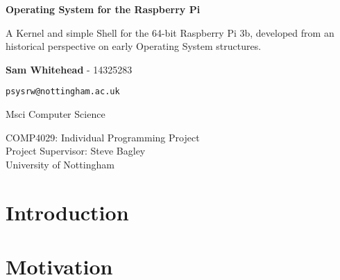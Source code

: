 \documentclass{article}
\begin{document}
\begin{titlepage}
    \begin{center}
        \null\mbox{}\vfill

        \vspace*{1cm}

        \huge
        \textbf{Operating System for the Raspberry Pi}

        \vspace{0.5cm}
        \Large
        A Kernel and simple Shell for the 64-bit Raspberry Pi 3b, developed
        from an historical perspective on early Operating System structures.

        \Large

        \vspace{2.5cm}

        \textbf{Sam Whitehead} - 14325283

        \texttt{psysrw@nottingham.ac.uk}

        Msci Computer Science

        \vfill

        COMP4029: Individual Programming Project\\
        Project Supervisor: Steve Bagley\\
        University of Nottingham

        \vfill\null
    \end{center}
    \thispagestyle{empty}
\end{titlepage}

{\hypersetup{hidelinks} \tableofcontents}
\clearpage

\section{Introduction}
\section{Motivation}
\end{document}

